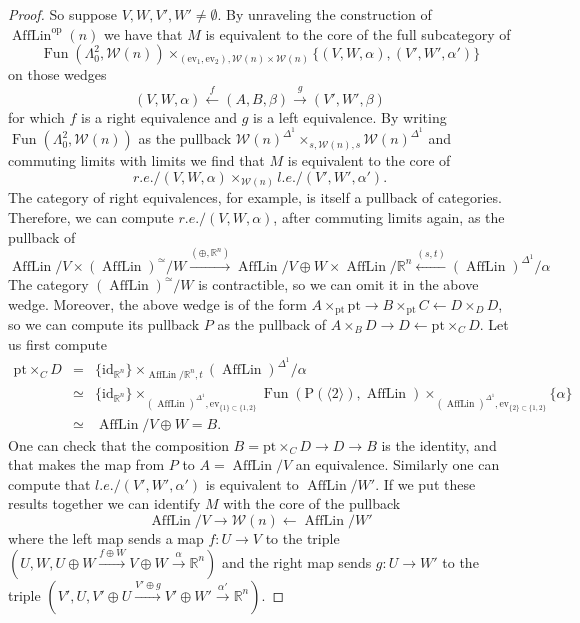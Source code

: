 \documentclass{article}
\newcommand{\xto}{\xrightarrow}
\newcommand{\xot}{\xleftarrow}
\newcommand{\R}{\mathbb{R}} %
\newcommand{\cO}{\AffLin}
\newcommand{\pt}{\mathrm{pt}}
\newcommand{\op}{\mathrm{op}}
\newcommand{\id}{\mathrm{id}}
\newcommand{\ev}{\mathrm{ev}}
\newcommand{\Pow}{\mathrm{P}}
\DeclareMathOperator{\Fun}{Fun}
\DeclareMathOperator{\AffLin}{AffLin}
\begin{document}
\begin{proof}
    So suppose $V,W,V',W' \neq \emptyset$. By unraveling the construction of
    $\cO^\op(n)$ we have that $M$ is equivalent to the core of the
    full subcategory of
    \[
      \Fun(\Lambda^2_0, {\mathcal W(n)}) \times_{(\ev_1,\ev_2),
        {\mathcal W(n)}\times {\mathcal W(n)}} \{(V,W,\alpha),(V',W',\alpha')\}
    \]
    on those wedges
    \[
      (V,W,\alpha) \xleftarrow{f} (A,B,\beta) \xto{g} (V',W',\beta)
    \]
    for which $f$ is a right equivalence and $g$ is a left equivalence.
    By writing $ \Fun(\Lambda^2_0, {\mathcal W(n)}) $ as the
    pullback ${\mathcal W(n)}^{\Delta^1} \times_{s,{\mathcal W(n)},s} {\mathcal W(n)}^{\Delta^1}$
    and commuting limits with limits we find that $M$ is equivalent to the core of
    \[
      r.e./(V,W,\alpha) \times_{{\mathcal W(n)}} l.e./(V',W',\alpha').
    \]
    The category of right equivalences, for example,
    is itself a pullback of categories.
    Therefore, we can compute $r.e./(V,W,\alpha)$, after
    commuting limits again, as the pullback of
    \[
      \cO/V \times (\cO)^\simeq/W \xto{(\oplus, \R^n)} \cO/V\oplus W \times
      \cO/\R^n \xot{(s,t)} (\cO)^{\Delta^1}/\alpha
    \]
    The category $(\cO)^\simeq/W$ is contractible, so we can omit it in the above wedge.
    Moreover, the above wedge is of the form
    $A \times_{\pt} \pt \to B \times_{\pt} C \leftarrow D \times_D D$,
    so we can compute its pullback $P$ as the
    pullback of  $A \times_B D \to D \leftarrow \pt \times_C D$.
    Let us first compute
    \begin{eqnarray*}
      \pt \times_C D &=& \{\id_{\R^n}\} \times_{\cO/\R^n,t} (\cO)^{\Delta^1}/\alpha \\
      & \simeq & \{\id_{\R^n}\} \times_{(\cO)^{\Delta^1}, \ev_{\{1\} \subset \{1,2\} }}
      \Fun(\Pow(\langle 2 \rangle), \cO)
      \times_{(\cO)^{\Delta^1}, \ev_{\{2\} \subset \{1,2\} }} \{\alpha \} \\
      & \simeq & \cO / V \oplus W  = B .
    \end{eqnarray*}
    One can check that the composition $B = \pt \times_C D \to D \to B$ is the identity,
    and that makes the map from $P$ to $A = \cO/V$ an equivalence.
    Similarly one can compute that $l.e./(V',W',\alpha')$ is equivalent to
    $\cO/W'$.
    If we put these results together we can identify $M$ with the core of the pullback
    \[
      \cO/V \to {\mathcal W(n)} \leftarrow \cO/W'
    \]
    where the left map sends a map $f\colon U \to V$ to the triple
    $(U,W, U\oplus W \xto{f \oplus W} V \oplus W \xto{\alpha} \R^n)$ and
    the right map sends $g \colon U \to W'$ to the triple
    $(V',U,V' \oplus U \xto{V' \oplus g} V' \oplus W' \xto{\alpha'} \R^n)$.
  

\end{proof}
\end{document}
